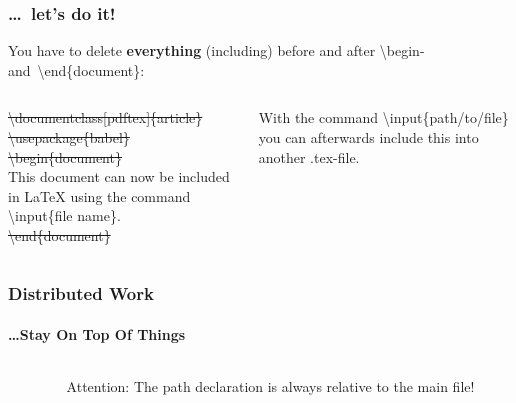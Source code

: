 \begin{frame}
\frametitle{\ldots ~let's do it!}
You have to delete \textbf{everything} (including) before and after \color{unibablueI}\textbackslash begin\color{black}- 
and\color{unibablueI}~\textbackslash end\color{black}\{document\}:\\[5mm]
\begin{columns}
\begin{column}{.47\textwidth}
\sout{\color{nounibaredI}\color{nounibaredI}\textbackslash documentclass\color{black}\color{nounibagreenI}[pdftex]\color{black}\{article\} \\
\color{nounibaredI}\textbackslash usepackage\color{black}\{babel\}\\
\color{nounibaredI}\color{unibablueI}\textbackslash\color{unibablueI}begin\color{black}\color{black}\{document\} }\\
This document can now be included in LaTeX using the command \color{nounibaredI}\color{nounibaredI}\textbackslash input\color{nounibaredI}\color{black}\{file name\}.\\
\sout{\color{nounibaredI}\color{unibablueI}\textbackslash\color{unibablueI}end\color{black}\color{black}\{document\} }
\end{column}
\begin{column}{.47\textwidth}
With the command \color{nounibaredI}\textbackslash input\color{black}\{path/to/file\} you can afterwards
 include this into another {\ttfamily .tex}-file. 

\end{column}
\end{columns}
\end{frame}

\begin{frame}
\frametitle{Distributed Work}
\framesubtitle{\ldots Stay On Top Of Things}
\begin{columns}{2}
\begin{column}{.6\textwidth}
\end{column}
\begin{column}{.3\textwidth}
\begin{alertblock}{Attention:}
The path declaration is always relative to the main file!
\end{alertblock}
\end{column}
\end{columns}

\end{frame}


